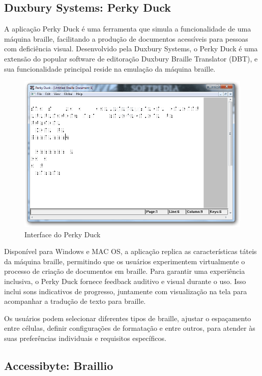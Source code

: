 \subsection{Duxbury Systems: Perky Duck}

A aplicação Perky Duck é uma ferramenta que simula a funcionalidade de uma máquina braille, facilitando a produção de documentos acessíveis para pessoas com deficiência visual. Desenvolvido pela Duxbury Systems, o Perky Duck é uma extensão do popular software de editoração Duxbury Braille Translator (DBT), e sua funcionalidade principal reside na emulação da máquina braille. 

\begin{figure}[h]
    \centering
    \includegraphics[scale=0.5]{ch02/assets/perky-duck-gui.png}
    \decoRule
    \caption[Interface do Perky Duck]{Interface do Perky Duck}
    \label{fig:ch02-perky-duck-gui}
\end{figure}

Disponível para Windows e MAC OS, a aplicação replica as características táteis da máquina braille, permitindo que os usuários experimentem virtualmente o processo de criação de documentos em braille. Para garantir uma experiência inclusiva, o Perky Duck fornece feedback auditivo e visual durante o uso. Isso inclui sons indicativos de progresso, juntamente com visualização na tela para acompanhar a tradução de texto para braille. 

Os usuários podem selecionar diferentes tipos de braille, ajustar o espaçamento entre células, definir configurações de formatação e entre outros, para atender às suas preferências individuais e requisitos específicos.

\subsection{Accessibyte: Braillio}

